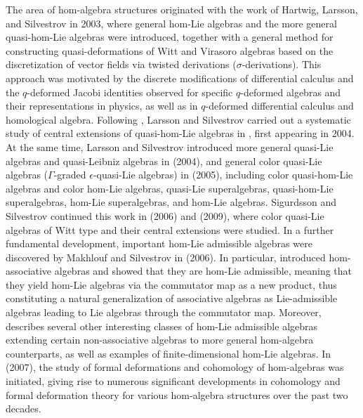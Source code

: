\documentclass[12pt]{article}
\begin{document}
		The area of hom-algebra structures originated with the work of Hartwig, Larsson, and Silvestrov \cite{Hartwig-Larsson-Silvestrov} in 2003, where general hom-Lie algebras and the more general quasi-hom-Lie algebras were introduced, together with a general method for constructing quasi-deformations of Witt and Virasoro algebras based on the discretization of vector fields via twisted derivations ($\sigma$-derivations). This approach was motivated by the discrete modifications of differential calculus and the $q$-deformed Jacobi identities observed for specific $q$-deformed algebras and their representations in physics, as well as in $q$-deformed differential calculus and homological algebra. Following \cite{Hartwig-Larsson-Silvestrov}, Larsson and Silvestrov carried out a systematic study of central extensions of quasi-hom-Lie algebras in \cite{LarssonSilvJA2005:QuasiHomLieCentExt2cocyid}, first appearing in 2004. At the same time, Larsson and Silvestrov introduced more general quasi-Lie algebras and quasi-Leibniz algebras in \cite{Larsson-Silvestrov-QuasiLiealg} (2004), and general color quasi-Lie algebras ($\Gamma$-graded $\epsilon$-quasi-Lie algebras) in \cite{LSGradedquasiLiealg} (2005), including color quasi-hom-Lie algebras and color hom-Lie algebras, quasi-Lie superalgebras, quasi-hom-Lie superalgebras, hom-Lie superalgebras, and hom-Lie algebras. Sigurdsson and Silvestrov continued this work in \cite{Sigurdsson-Silvestrov-Czech:witt} (2006) and \cite{SigSilvGLTbdSpringer2009-witt-centrext} (2009), where color quasi-Lie algebras of Witt type and their central extensions were studied. In a further fundamental development, important hom-Lie admissible algebras were discovered by Makhlouf and Silvestrov in \cite{ms:homstructure} (2006). In particular, \cite{ms:homstructure} introduced hom-associative algebras and showed that they are hom-Lie admissible, meaning that they yield hom-Lie algebras via the commutator map as a new product, thus constituting a natural generalization of associative algebras as Lie-admissible algebras leading to Lie algebras through the commutator map. Moreover, \cite{ms:homstructure} describes several other interesting classes of hom-Lie admissible algebras extending certain non-associative algebras to more general hom-algebra counterparts, as well as examples of finite-dimensional hom-Lie algebras. In \cite{MakSil-formaldefs} (2007), the study of formal deformations and cohomology of hom-algebras was initiated, giving rise to numerous significant developments in cohomology and formal deformation theory for various hom-algebra structures over the past two decades.
		
\end{document}
